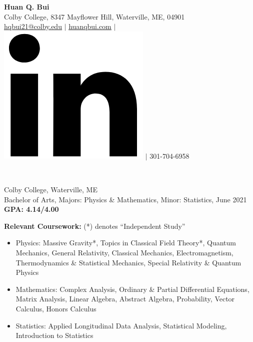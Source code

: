 \documentclass[letter, 9pt]{article}
\newcommand{\longunderline}[1]{\uline{#1\hfill\mbox{}}}
\begin{document}
	\begin{center}
		{\Large\textbf{Huan Q. Bui}}\\
		\smallskip
		Colby College, 8347 Mayflower Hill, Waterville, ME, 04901\\ \href{mailto:hqbui21@colby.edu}{\underline{hqbui21@colby.edu}} $\vert$ \href{https://huanqbui.com}{\underline{huanqbui.com}} $\vert$ \href{https://www.linkedin.com/in/huan-bui/}{\includegraphics[scale=0.04]{linkedin_logo.PNG}} $\vert$ 301-704-6958
	\end{center}
	\noindent \longunderline{\normalsize{{}}}\\
	\vspace{-7pt}
	
	
			\noindent Colby College, Waterville, ME\\
			Bachelor of Arts, {Majors}: Physics \& Mathematics, {Minor}: Statistics, June 2021 \hfill \textbf{GPA: 4.14/4.00}\\
			\vspace{-7pt}

			\noindent \textbf{Relevant Coursework:} (*) denotes ``Independent Study''
			\begin{itemize}[noitemsep, nolistsep]
				\item Physics: Massive Gravity*, Topics in Classical Field Theory*, Quantum Mechanics, General Relativity, Classical Mechanics, Electromagnetism, Thermodynamics \& Statistical Mechanics, Special Relativity \& Quantum Physics
				\item Mathematics: Complex Analysis, Ordinary \& Partial Differential Equations, Matrix Analysis, Linear Algebra, Abstract Algebra, Probability, Vector Calculus, Honors Calculus
				\item Statistics: Applied Longitudinal Data Analysis, Statistical Modeling, Introduction to Statistics \\
			\end{itemize}
 
\end{document}
